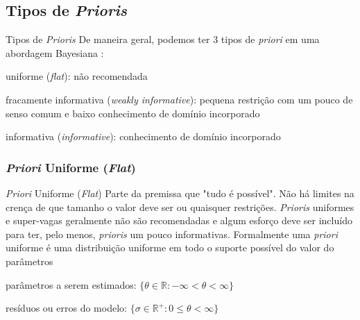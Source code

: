 \subsection{Tipos de \textit{Prioris}}

\begin{frame}{Tipos de \textit{Prioris}}
    De maneira geral, podemos ter 3 tipos de \textit{priori} em uma abordagem
    Bayesiana \parencite{gelman2013bayesian, mcelreath2020statistical, vandeschootBayesianStatisticsModelling2021}:
    \begin{vfilleditems}
        \item uniforme (\textit{flat}): não recomendada
        \item fracamente informativa (\textit{weakly informative}): pequena restrição
        com um pouco de senso comum e baixo conhecimento de domínio incorporado
        \item informativa (\textit{informative}): conhecimento de domínio incorporado
    \end{vfilleditems}
\end{frame}

\subsubsection{\textit{Priori} Uniforme (\textit{Flat})}
\begin{frame}{\textit{Priori} Uniforme (\textit{Flat})}
    Parte da premissa que "tudo é possível". Não há limites na crença de que tamanho
    o valor deve ser ou quaisquer restrições.
    \vfill
    \textit{Prioris} uniformes e super-vagas geralmente não são recomendadas e algum
    esforço deve ser incluído para ter, pelo menos, \textit{prioris} um pouco
    informativas.
    \vfill
    Formalmente uma \textit{priori} uniforme é uma distribuição uniforme em todo o
    suporte possível do valor do parâmetros
    \begin{vfilleditems}
        \item parâmetros a serem estimados: $\{\theta \in \mathbb{R} : -\infty < \theta < \infty\}$
        \item resíduos ou erros do modelo: $\{\sigma \in \mathbb{R}^+ : 0 \leq \theta < \infty\}$
    \end{vfilleditems}
\end{frame}

